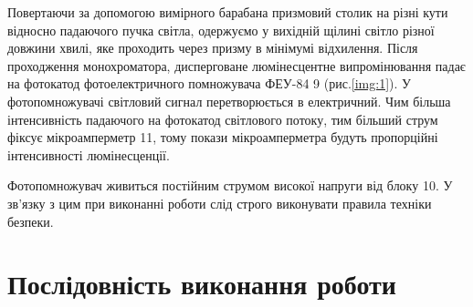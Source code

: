 \documentclass[twocolumn]{el-author}
\begin{document}
Повертаючи за допомогою вимірного барабана призмовий столик на
різні кути відносно падаючого пучка світла, одержуємо у вихідній щілині
світло різної довжини хвилі, яке проходить через призму в мінімумі
відхилення. Після проходження монохроматора, дисперговане
люмінесцентне випромінювання падає на фотокатод фотоелектричного
помножувача ФЕУ-84 9 (рис.\ref{img:1}). У фотопомножувачі світловий сигнал
перетворюється в електричний. Чим більша інтенсивність падаючого на
фотокатод світлового потоку, тим більший струм фіксує мікроамперметр 11,
тому покази  мікроамперметра будуть пропорційні інтенсивності
люмінесценції.

Фотопомножувач живиться постійним струмом високої напруги від
блоку 10. У зв'язку з цим при виконанні роботи слід строго виконувати
правила техніки безпеки.








\section{Послідовність виконання роботи}
\end{document}
